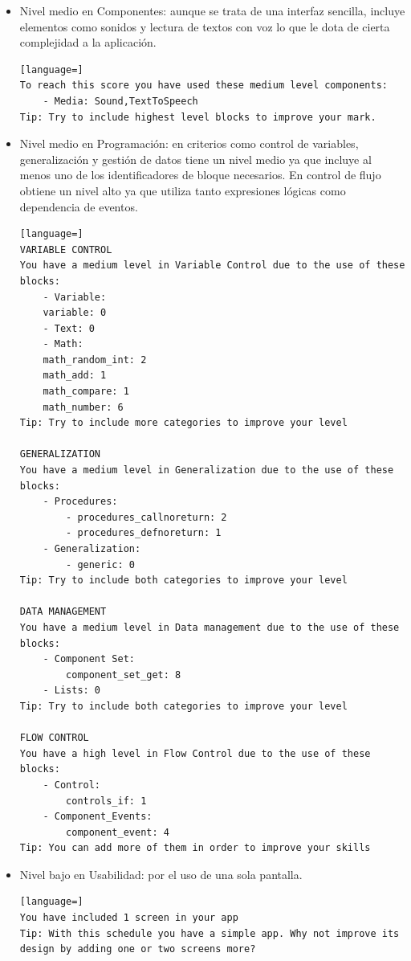 \documentclass[a4paper, 12pt]{book}
\begin{document}
\begin{itemize}
  \item Nivel medio en Componentes: aunque se trata de una interfaz sencilla, incluye elementos como sonidos y lectura de textos con voz lo que le dota de cierta complejidad a la aplicación.
\begin{lstlisting}[language=]
To reach this score you have used these medium level components:
    - Media: Sound,TextToSpeech
Tip: Try to include highest level blocks to improve your mark.
\end{lstlisting}
  \item Nivel medio en Programación: en criterios como control de variables, generalización y gestión de datos tiene un nivel medio ya que incluye al menos uno de los identificadores de bloque necesarios. En control de flujo obtiene un nivel alto ya que utiliza tanto expresiones lógicas como dependencia de eventos. 
\begin{lstlisting}[language=]
VARIABLE CONTROL
You have a medium level in Variable Control due to the use of these blocks:
    - Variable:
	variable: 0
    - Text: 0
    - Math:
	math_random_int: 2
	math_add: 1
	math_compare: 1
	math_number: 6
Tip: Try to include more categories to improve your level

GENERALIZATION
You have a medium level in Generalization due to the use of these blocks:
    - Procedures:
        - procedures_callnoreturn: 2
        - procedures_defnoreturn: 1
    - Generalization:
        - generic: 0
Tip: Try to include both categories to improve your level

DATA MANAGEMENT
You have a medium level in Data management due to the use of these blocks:
    - Component Set:
        component_set_get: 8
    - Lists: 0
Tip: Try to include both categories to improve your level

FLOW CONTROL 
You have a high level in Flow Control due to the use of these blocks:
    - Control:
        controls_if: 1
    - Component_Events:
        component_event: 4
Tip: You can add more of them in order to improve your skills
\end{lstlisting}
  \item Nivel bajo en Usabilidad: por el uso de una sola pantalla.
\begin{lstlisting}[language=]
You have included 1 screen in your app
Tip: With this schedule you have a simple app. Why not improve its design by adding one or two screens more? 
\end{lstlisting}
\end{itemize}
\end{document}
